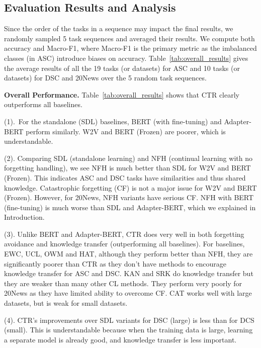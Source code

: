\documentclass{article}
\begin{document}
\vspace{-1mm}
\subsection{Evaluation Results and Analysis}
\label{sec:results}
Since the order of the tasks in a sequence may impact the final results, we randomly sampled 5 task sequences and averaged their results.
We compute both accuracy and Macro-F1, where Macro-F1 is the primary metric as the imbalanced classes (in ASC) introduce biases on accuracy. {\color{black}Table~\ref{tab:overall_results} gives the average results of all the 19 tasks (or datasets) for ASC and 10 tasks (or datasets) for DSC and 20News over the 5 random task sequences.} 




\textbf{Overall Performance.} 
Table~\ref{tab:overall_results} shows that CTR clearly outperforms all baselines. 

(1).~For the standalone (SDL) baselines, BERT {(with fine-tuning)} and Adapter-BERT perform similarly. W2V {and BERT (Frozen) are} poorer, which is understandable.

{\color{black}(2). Comparing SDL (standalone learning) and NFH (continual learning with no forgetting handling), we see NFH is much better than SDL for W2V {and BERT (Frozen)}. This indicates ASC {and DSC} tasks have similarities and thus shared knowledge. Catastrophic forgetting (CF) is not a major issue for W2V {and BERT (Frozen)}. However, for 20News, NFH variants have serious CF. NFH with BERT (fine-tuning) is much worse than SDL and Adapter-BERT, which we explained in Introduction. } 

(3). Unlike BERT and Adapter-BERT, CTR does very well in both forgetting avoidance and knowledge transfer (outperforming all baselines). For baselines, EWC, UCL, OWM and HAT, although they perform better than NFH, they are significantly poorer than CTR as they don't have methods to encourage knowledge transfer for ASC and DSC. KAN and SRK {do knowledge transfer but they are weaker than many other CL methods.} They perform very poorly for 20News as they have limited ability to overcome CF. CAT works well with large datasets, but is weak for small datasets. 

(4). CTR's improvements over SDL variants for DSC (large) is less than for DCS (small). This is understandable because when the training data is large, learning a separate model is already good, and knowledge transfer is less important. 
\end{document}
